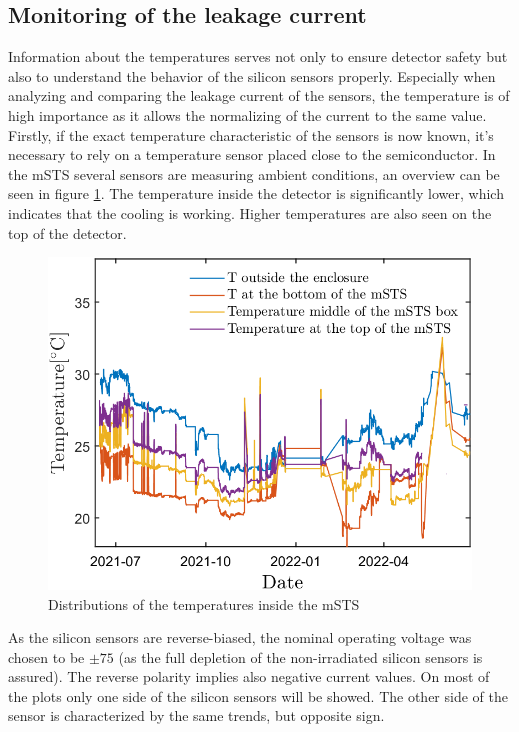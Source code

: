 \subsection{Monitoring of the leakage current}

Information about the temperatures serves not only to ensure detector safety but also to understand the behavior of the silicon sensors properly. Especially when analyzing and comparing the leakage current of the sensors, the temperature is of high importance as it allows the normalizing of the current to the same value. Firstly, if the exact temperature characteristic of the sensors is now known, it's necessary to rely on a temperature sensor placed close to the semiconductor. In the \gls{mSTS} several sensors are measuring ambient conditions, an overview can be seen in figure \ref{fig_temperatures}. The temperature inside the detector is significantly lower, which indicates that the cooling is working. Higher temperatures are also seen on the top of the detector. 

\newpage
\begin{figure}[!h]
\centering
\includegraphics[width=0.55\columnwidth]{Chapter6/DCS/images/rates/tempmSTS.png}
\caption{Distributions of the temperatures inside the \gls{mSTS}}
\label{fig_temperatures}
\end{figure}

As the silicon sensors are reverse-biased, the nominal operating voltage was chosen to be $\pm75$ (as the full depletion of the non-irradiated silicon sensors is assured). The reverse polarity implies also negative current values. On most of the plots only one side of the silicon sensors will be showed. The other side of the sensor is characterized by the same trends, but opposite sign.

